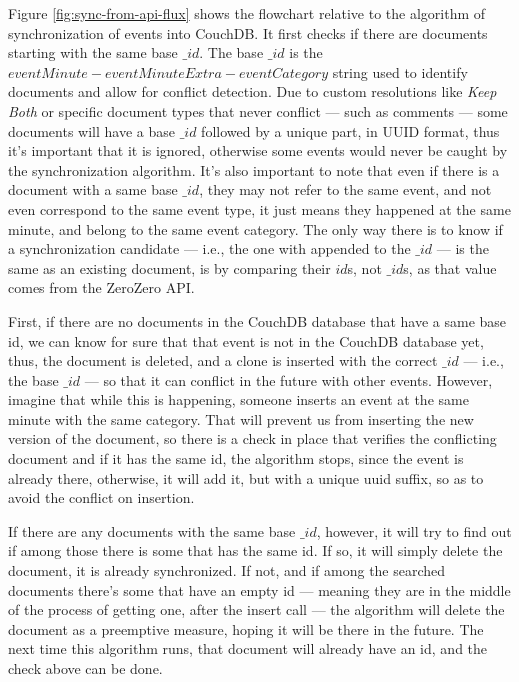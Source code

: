 Figure \ref{fig:sync-from-api-flux} shows the flowchart relative to the algorithm of synchronization of events into CouchDB. It first checks if there are documents starting with the same base $\_id$. The base $\_id$ is the $eventMinute-eventMinuteExtra-eventCategory$ string used to identify documents and allow for conflict detection. Due to custom resolutions like \textit{Keep Both} or specific document types that never conflict --- such as comments --- some documents will have a base $\_id$ followed by a unique part, in UUID format, thus it's important that it is ignored, otherwise some events would never be caught by the synchronization algorithm. It's also important to note that even if there is a document with a same base $\_id$, they may not refer to the same event, and not even correspond to the same event type, it just means they happened at the same minute, and belong to the same event category. The only way there is to know if a synchronization candidate --- i.e., the one with  appended to the $\_id$ ---  is the same as an existing document, is by comparing their $id$s, not $\_id$s, as that value comes from the ZeroZero API.

First, if there are no documents in the CouchDB database that have a same base id, we can know for sure that that event is not in the CouchDB database yet, thus, the  document is deleted, and a clone is inserted with the correct $\_id$ --- i.e., the base $\_id$ --- so that it can conflict in the future with other events. However, imagine that while this is happening, someone inserts an event at the same minute with the same category. That will prevent us from inserting the new version of the  document, so there is a check in place that verifies the conflicting document and if it has the same id, the algorithm stops, since the event is already there, otherwise, it will add it, but with a unique uuid suffix, so as to avoid the conflict on insertion.

If there are any documents with the same base $\_id$, however, it will try to find out if among those there is some that has the same id. If so, it will simply delete the  document, it is already synchronized. If not, and if among the searched documents there's some that have an empty id --- meaning they are in the middle of the process of getting one, after the insert call --- the algorithm will delete the  document as a preemptive measure, hoping it will be there in the future. The next time this algorithm runs, that document will already have an id, and the check above can be done.

